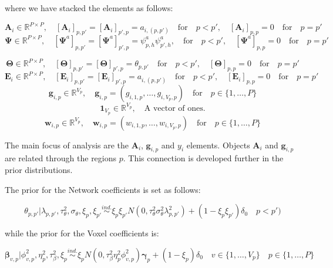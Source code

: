 \documentclass[
]{article}
\begin{document}
where we have stacked the elements as follows:

\[ \mathbf{A}_i \in \mathbb{R}^{P \times P}, \quad [\mathbf{A}_i]_{p,p'}=[\mathbf{A}_i]_{p',p}=a_{i,(p,p')} \quad \text{for} \quad p < p', \quad  [\mathbf{A}_i]_{p,p} = 0 \quad \text{for} \quad p = p'\]
\[ \mathbf{\Psi} \in \mathbb{R}^{P \times P}, \quad [\mathbf{\Psi}^a]_{p,p'} = [\mathbf{\Psi}^a]_{p',p} = \psi_{p,h}^a \psi_{p',h}^a, \quad \text{for} \quad p < p', \quad  [\mathbf{\Psi}^a]_{p,p} = 0 \quad \text{for} \quad p = p' \]

\[ \mathbf{\Theta} \in \mathbb{R}^{P \times P}, \quad [\mathbf{\Theta}]_{p,p'} = [\mathbf{\Theta}]_{p',p} = \theta_{p,p'} \quad \text{for} \quad p < p', \quad [\mathbf{\Theta}]_{p,p} = 0 \quad \text{for} \quad p = p' \]
\[ \mathbf{E}_i \in \mathbb{R}^{P \times P}, \quad [\mathbf{E}_i]_{p,p'}=[\mathbf{E}_i]_{p',p}=a_{i,(p,p')} \quad \text{for} \quad p < p', \quad  [\mathbf{E}_i]_{p,p} = 0 \quad \text{for} \quad p = p' \]
\[ \mathbf{g}_{i,p} \in \mathbb{R}^{V_p}, \quad \mathbf{g}_{i,p}=(g_{i,1,p},\ldots,g_{i,V_p,p}) \quad \text{for} \quad p \in \{1,\ldots,P\}\]
\[ \mathbf{1}_{V_p} \in \mathbb{R}^{V_p}, \quad \text{A vector of ones.}\]
\[ \mathbf{w}_{i,p} \in \mathbb{R}^{V_p}, \quad \mathbf{w}_{i,p}=(w_{i,1,p},\ldots,w_{i,V_p,p}) \quad \text{for} \quad p \in \{1,\ldots,P\}\]

The main focus of analysis are the \(\mathbf{A}_i\), \(\mathbf{g}_{i,p}\) and \(y_i\) elements. Objects \(\mathbf{A}_i\) and \(\mathbf{g}_{i,p}\) are related through the regions \(p\). This connection is developed further in the prior distributions.

The prior for the Network coefficients is set as follows:

\begin{equation}
\theta_{p,p'}| \lambda_{p,p'},\tau^2_\theta,\sigma_\theta,\xi_p,\xi_{p'} \stackrel{ind.}{\sim} \xi_p \xi_{p'}N(0, \tau^2_\theta \sigma^2_\theta \lambda^2_{p,p'}) + (1-\xi_p \xi_{p'}) \delta_0 \quad p < p')
\label{eq:networkPrior}
\end{equation}

while the prior for the Voxel coefficients is:

\begin{equation}
\mathbf{\beta}_{v,p}|\phi^2_{v,p},\eta_p^2,\tau^2_\beta, \xi_p \stackrel{ind.}{\sim} \xi_p N(0, \tau^2_\beta \eta_p^2 \phi^2_{v,p}) \mathbf{\gamma}_p + (1-\xi_p ) \delta_0  \quad v \in \{1,\ldots,V_p\} \quad p \in \{1,\ldots,P\}
\label{eq:voxelkPrior}
\end{equation}
\end{document}
